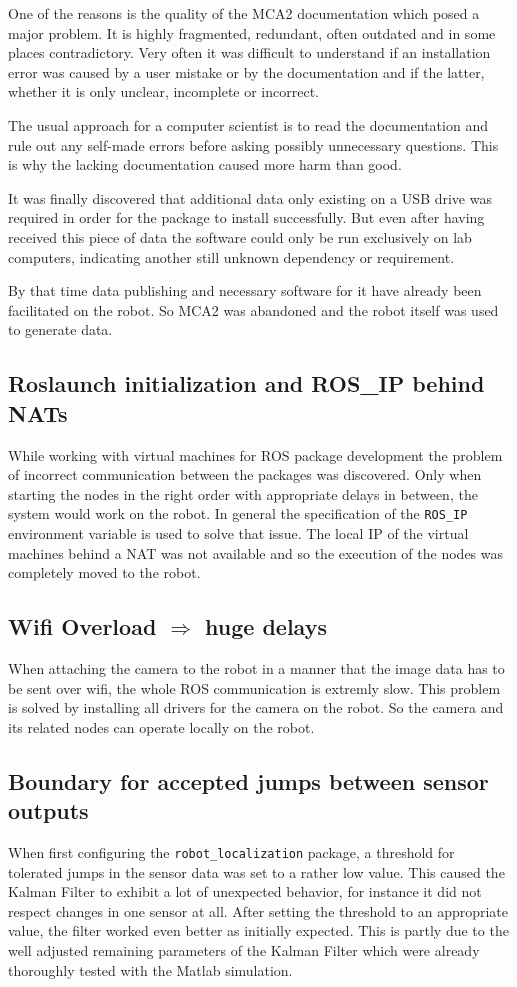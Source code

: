 One of the reasons is the quality of the MCA2 documentation which posed a major problem. It is highly fragmented, redundant, often outdated and in some places contradictory. Very often it was difficult to understand if an installation error was caused by a user mistake or by the documentation and if the latter, whether it is only unclear, incomplete or incorrect. 

The usual approach for a computer scientist is to read the documentation and rule out any self-made errors before asking possibly unnecessary questions. This is why the lacking documentation caused more harm than good.

It was finally discovered that additional data only existing on a USB drive was required in order for the package to install successfully. But even after having received this piece of data the software could only be run exclusively on lab computers, indicating another still unknown dependency or requirement.

By that time data publishing and necessary software for it have already been facilitated on the robot. So MCA2 was abandoned and the robot itself was used to generate data.

\subsection{Roslaunch initialization and ROS\_IP behind NATs}
While working with virtual machines for ROS package development the problem of incorrect communication between the packages was discovered. Only when starting the nodes in the right order with appropriate delays in between, the system would work on the robot. In general the specification of the \texttt{ROS\_IP} environment variable is used to solve that issue. The local IP of the virtual machines behind a NAT was not available and so the execution of the nodes was completely moved to the robot.

\subsection{Wifi Overload $\Rightarrow$ huge delays}
When attaching the camera to the robot in a manner that the image data has to be sent over wifi, the whole ROS communication is extremly slow. This problem is solved by installing all drivers for the camera on the robot. So the camera and its related nodes can operate locally on the robot.

\subsection{Boundary for accepted jumps between sensor outputs}
When first configuring the \texttt{robot\_localization} package, a threshold for tolerated jumps in the sensor data was set to a rather low value. This caused the Kalman Filter to exhibit a lot of unexpected behavior, for instance it did not respect changes in one sensor at all. After setting the threshold to an appropriate value, the filter worked even better as initially expected. This is partly due to the well adjusted remaining parameters of the Kalman Filter which were already thoroughly tested with the Matlab simulation.

